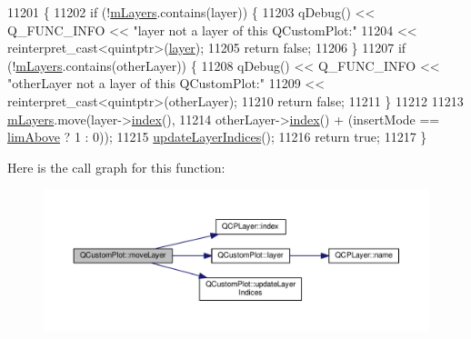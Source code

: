 \begin{DoxyCode}
11201                                                                    \{
11202   \textcolor{keywordflow}{if} (!\hyperlink{class_q_custom_plot_a9685e7ec1ef5e6066dd7d91bb3a698b3}{mLayers}.contains(layer)) \{
11203     qDebug() << Q\_FUNC\_INFO << \textcolor{stringliteral}{"layer not a layer of this QCustomPlot:"}
11204              << \textcolor{keyword}{reinterpret\_cast<}quintptr\textcolor{keyword}{>}(\hyperlink{class_q_custom_plot_aac492da01782820454e9136a8db28182}{layer});
11205     \textcolor{keywordflow}{return} \textcolor{keyword}{false};
11206   \}
11207   \textcolor{keywordflow}{if} (!\hyperlink{class_q_custom_plot_a9685e7ec1ef5e6066dd7d91bb3a698b3}{mLayers}.contains(otherLayer)) \{
11208     qDebug() << Q\_FUNC\_INFO << \textcolor{stringliteral}{"otherLayer not a layer of this QCustomPlot:"}
11209              << \textcolor{keyword}{reinterpret\_cast<}quintptr\textcolor{keyword}{>}(otherLayer);
11210     \textcolor{keywordflow}{return} \textcolor{keyword}{false};
11211   \}
11212 
11213   \hyperlink{class_q_custom_plot_a9685e7ec1ef5e6066dd7d91bb3a698b3}{mLayers}.move(layer->\hyperlink{class_q_c_p_layer_ad5d7010829a6b99f326b07d7e37c8c99}{index}(),
11214                otherLayer->\hyperlink{class_q_c_p_layer_ad5d7010829a6b99f326b07d7e37c8c99}{index}() + (insertMode == \hyperlink{class_q_custom_plot_a75a8afbe6ef333b1f3d47abb25b9add7a062b0b7825650b432a713c0df6742d41}{limAbove} ? 1 : 0));
11215   \hyperlink{class_q_custom_plot_a3117754df3a5638787a6223c7147970f}{updateLayerIndices}();
11216   \textcolor{keywordflow}{return} \textcolor{keyword}{true};
11217 \}
\end{DoxyCode}


Here is the call graph for this function\+:\nopagebreak
\begin{figure}[H]
\begin{center}
\leavevmode
\includegraphics[width=350pt]{class_q_custom_plot_ae896140beff19424e9e9e02d6e331104_cgraph}
\end{center}
\end{figure}


